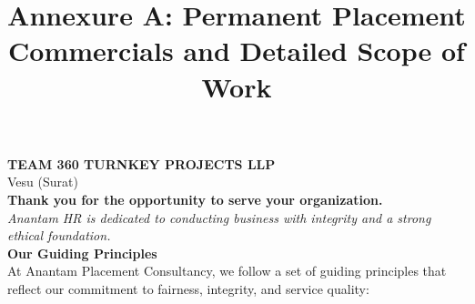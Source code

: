 \documentclass{article}
\title{\textbf{\color{primary} Annexure A: Permanent Placement Commercials and Detailed Scope of Work}}
\date{}
\begin{document}
\maketitle

\noindent\textbf{TEAM 360 TURNKEY PROJECTS LLP}\\
Vesu (Surat)\\[1em]

\noindent\textbf{Thank you for the opportunity to serve your organization.}\\[0.5em]
\noindent\textit{Anantam HR is dedicated to conducting business with integrity and a strong ethical foundation.}\\[1em]

\noindent\textbf{\color{secondary} Our Guiding Principles}\\[0.5em]
\noindent At Anantam Placement Consultancy, we follow a set of guiding principles that reflect our commitment to fairness, integrity, and service quality:
\end{document}
